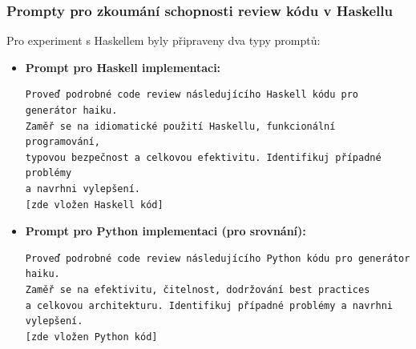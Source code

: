 \documentclass[12pt, a4paper]{article}
\begin{document}
\subsubsection{Prompty pro zkoumání schopnosti review kódu v Haskellu}
Pro experiment s Haskellem byly připraveny dva typy promptů:
\begin{itemize}
\item \textbf{Prompt pro Haskell implementaci:}
\begin{verbatim}
Proveď podrobné code review následujícího Haskell kódu pro generátor haiku.
Zaměř se na idiomatické použití Haskellu, funkcionální programování,
typovou bezpečnost a celkovou efektivitu. Identifikuj případné problémy
a navrhni vylepšení.
[zde vložen Haskell kód]
\end{verbatim}
\item \textbf{Prompt pro Python implementaci (pro srovnání):}
\begin{verbatim}
Proveď podrobné code review následujícího Python kódu pro generátor haiku.
Zaměř se na efektivitu, čitelnost, dodržování best practices
a celkovou architekturu. Identifikuj případné problémy a navrhni vylepšení.
[zde vložen Python kód]
\end{verbatim}
\end{itemize}
\end{document}
